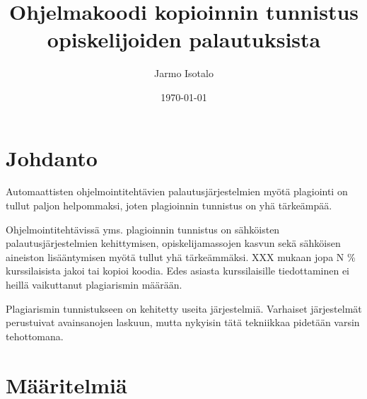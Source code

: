 \documentclass[finnish]{../tktltiki2}
\title{Ohjelmakoodi kopioinnin tunnistus opiskelijoiden palautuksista}
\author{Jarmo Isotalo}
\date{\today}
\theoremstyle{definition}
\theoremstyle{remark}
\begin{document}

\frontmatter      %

\maketitle        %

\tableofcontents  %


\mainmatter       %


\section{Johdanto}

Automaattisten ohjelmointitehtävien palautusjärjestelmien myötä plagiointi on tullut paljon helpommaksi, joten plagioinnin tunnistus on yhä tärkeämpää.


Ohjelmointitehtävissä yms. plagioinnin tunnistus on sähköisten palautusjärjestelmien kehittymisen, opiskelijamassojen kasvun sekä sähköisen aineiston lisääntymisen myötä tullut yhä tärkeämmäksi. XXX mukaan jopa N \% kurssilaisista jakoi tai kopioi koodia. Edes asiasta kurssilaisille tiedottaminen ei heillä vaikuttanut plagiarismin määrään.


Plagiarismin tunnistukseen on kehitetty useita järjestelmiä. Varhaiset järjestelmät perustuivat avainsanojen laskuun, mutta nykyisin tätä tekniikkaa pidetään varsin tehottomana.


\section{Määritelmiä}
\end{document}

